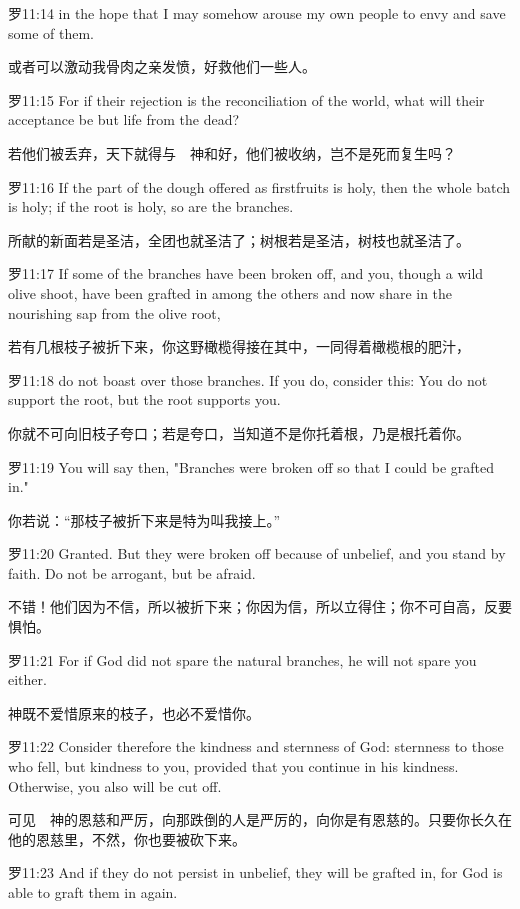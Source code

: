 \documentclass[a4paper,11pt,onecolumn,twoside]{ctexart}
\begin{document}
\begin{multicols}{2}
 罗11:14
 in the hope that I may somehow arouse my own people to envy and save some of them.

 或者可以激动我骨肉之亲发愤，好救他们一些人。


 罗11:15
 For if their rejection is the reconciliation of the world, what will their acceptance be but life from the dead?

 若他们被丢弃，天下就得与　神和好，他们被收纳，岂不是死而复生吗？


 罗11:16
 If the part of the dough offered as firstfruits is holy, then the whole batch is holy; if the root is holy, so are the branches.

 所献的新面若是圣洁，全团也就圣洁了；树根若是圣洁，树枝也就圣洁了。


 罗11:17
 If some of the branches have been broken off, and you, though a wild olive shoot, have been grafted in among the others and now share in the nourishing sap from the olive root,

 若有几根枝子被折下来，你这野橄榄得接在其中，一同得着橄榄根的肥汁，


 罗11:18
 do not boast over those branches. If you do, consider this: You do not support the root, but the root supports you.

 你就不可向旧枝子夸口；若是夸口，当知道不是你托着根，乃是根托着你。


 罗11:19
 You will say then, "Branches were broken off so that I could be grafted in."

 你若说：“那枝子被折下来是特为叫我接上。”


 罗11:20
 Granted. But they were broken off because of unbelief, and you stand by faith. Do not be arrogant, but be afraid.

 不错！他们因为不信，所以被折下来；你因为信，所以立得住；你不可自高，反要惧怕。


 罗11:21
 For if God did not spare the natural branches, he will not spare you either.

 神既不爱惜原来的枝子，也必不爱惜你。


 罗11:22
 Consider therefore the kindness and sternness of God: sternness to those who fell, but kindness to you, provided that you continue in his kindness. Otherwise, you also will be cut off.

 可见　神的恩慈和严厉，向那跌倒的人是严厉的，向你是有恩慈的。只要你长久在他的恩慈里，不然，你也要被砍下来。


 罗11:23
 And if they do not persist in unbelief, they will be grafted in, for God is able to graft them in again.


\end{multicols}
\end{document}
